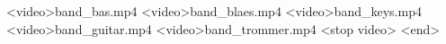 <video>band_bas.mp4
<video>band_blaes.mp4
<video>band_keys.mp4
<video>band_guitar.mp4
<video>band_trommer.mp4
<stop video>
<end>
